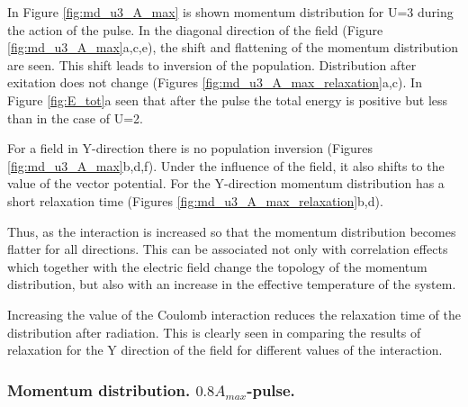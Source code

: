 In Figure \ref{fig:md_u3_A_max} is shown momentum distribution for U=3 during the action of the pulse. In the diagonal direction of the field (Figure \ref{fig:md_u3_A_max}a,c,e), the shift and flattening of the momentum distribution are seen. This shift leads to inversion of the population. Distribution after exitation does not change (Figures \ref{fig:md_u3_A_max_relaxation}a,c). In Figure \ref{fig:E_tot}a seen that after the pulse the total energy is positive but less than in the case of U=2.

For a field in Y-direction there is no population inversion (Figures \ref{fig:md_u3_A_max}b,d,f). Under the influence of the field, it also shifts to the value of the vector potential. For the Y-direction momentum distribution has a short relaxation time (Figures \ref{fig:md_u3_A_max_relaxation}b,d).

Thus, as the interaction is increased so that the momentum distribution becomes flatter for all directions. This can be associated not only with correlation effects which together with the electric field change the topology of the momentum distribution, but also with an increase in the effective temperature of the system.

Increasing the value of the Coulomb interaction reduces the relaxation time of the distribution after radiation. This is clearly seen in comparing the results of relaxation for the Y direction of the field for different values of the interaction.
\clearpage

\subsubsection{Momentum distribution. $0.8A_{max}$-pulse.}


